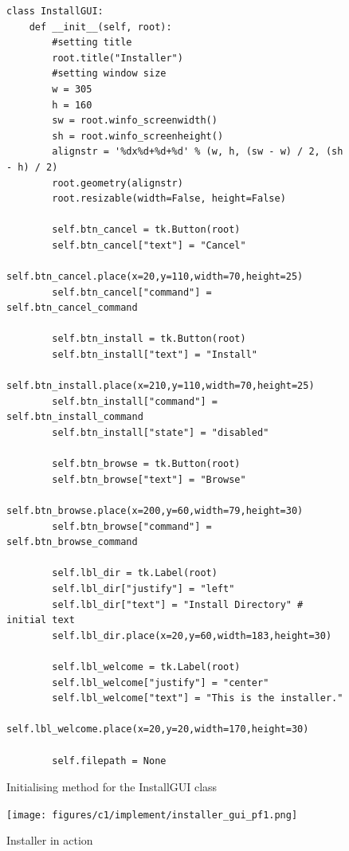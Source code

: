 \documentclass[11pt]{article}
\begin{document}
            \begin{figure}[!ht]
                \begin{verbatim}
class InstallGUI:
    def __init__(self, root):
        #setting title
        root.title("Installer")
        #setting window size
        w = 305
        h = 160
        sw = root.winfo_screenwidth()
        sh = root.winfo_screenheight()
        alignstr = '%dx%d+%d+%d' % (w, h, (sw - w) / 2, (sh - h) / 2)
        root.geometry(alignstr)
        root.resizable(width=False, height=False)

        self.btn_cancel = tk.Button(root)
        self.btn_cancel["text"] = "Cancel"
        self.btn_cancel.place(x=20,y=110,width=70,height=25)
        self.btn_cancel["command"] = self.btn_cancel_command

        self.btn_install = tk.Button(root)
        self.btn_install["text"] = "Install"
        self.btn_install.place(x=210,y=110,width=70,height=25)
        self.btn_install["command"] = self.btn_install_command
        self.btn_install["state"] = "disabled"

        self.btn_browse = tk.Button(root)
        self.btn_browse["text"] = "Browse"
        self.btn_browse.place(x=200,y=60,width=79,height=30)
        self.btn_browse["command"] = self.btn_browse_command

        self.lbl_dir = tk.Label(root)
        self.lbl_dir["justify"] = "left"
        self.lbl_dir["text"] = "Install Directory" # initial text
        self.lbl_dir.place(x=20,y=60,width=183,height=30)

        self.lbl_welcome = tk.Label(root)
        self.lbl_welcome["justify"] = "center"
        self.lbl_welcome["text"] = "This is the installer."
        self.lbl_welcome.place(x=20,y=20,width=170,height=30)
        
        self.filepath = None
                \end{verbatim}
                \caption{Initialising method for the InstallGUI class}
                \label{sc:install_gui_init_sc_c1}
            \end{figure}
            

            \begin{figure}[!ht]
                \centering
                \texttt{[image: figures/c1/implement/installer\_gui\_pf1.png]}
                \caption{Installer in action}
                \label{fig:installer_gui_ss1_c1}
            \end{figure}
\end{document}
